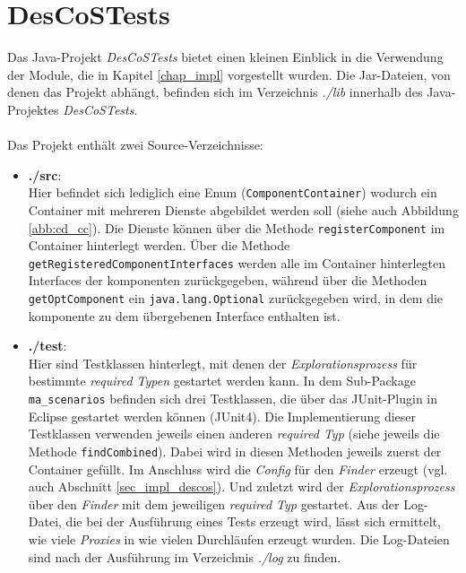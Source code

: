 \chapter{DesCoSTests}\label{app_test}
Das Java-Projekt \emph{DesCoSTests} bietet einen kleinen Einblick in die Verwendung der \Gls{Modul}e, die in Kapitel \ref{chap_impl} vorgestellt wurden. Die Jar-Dateien, von denen das Projekt abhängt, befinden sich im Verzeichnis \emph{./lib} innerhalb des Java-Projektes \emph{DesCoSTests}.
\\\\
Das Projekt enthält zwei Source-Verzeichnisse:
\begin{itemize}
\item \textbf{./src}: \\
Hier befindet sich lediglich eine Enum (\texttt{ComponentContainer}) wodurch ein Container mit mehreren Dienste abgebildet werden soll (siehe auch Abbildung \ref{abb:cd_cc}). Die Dienste können über die Methode \texttt{registerComponent} im Container hinterlegt werden. Über die Methode \texttt{getRegisteredComponentInterfaces} werden alle im Container hinterlegten \Gls{Interface}s der \Gls{komponente}n zurückgegeben, während über die Methoden \texttt{getOptComponent} ein \texttt{java.lang.Optional} zurückgegeben wird, in dem die \Gls{komponente} zu dem übergebenen \Gls{Interface} enthalten ist.

\item \textbf{./test}:\\
Hier sind Testklassen hinterlegt, mit denen der \emph{Explorationsprozess} für bestimmte \emph{required Typen} gestartet werden kann. In dem Sub-Package \texttt{ma\_scenarios} befinden sich drei Testklassen, die über das JUnit-Plugin in Eclipse gestartet werden können (JUnit4). Die Implementierung dieser Testklassen verwenden jeweils einen anderen \emph{required Typ} (siehe jeweils die Methode \texttt{findCombined}). Dabei wird in diesen Methoden jeweils zuerst der Container gefüllt. Im Anschluss wird die \emph{Config} für den \emph{Finder} erzeugt (vgl. auch Abschnitt \ref{sec_impl_descos}). Und zuletzt wird der \emph{Explorationsprozess} über den \emph{Finder} mit dem jeweiligen \emph{required Typ} gestartet. Aus der Log-Datei, die bei der Ausführung eines Tests erzeugt wird, lässt sich ermittelt, wie viele \emph{Proxies} in wie vielen Durchläufen erzeugt wurden. Die Log-Dateien sind nach der Ausführung im Verzeichnis \emph{./log} zu finden.
\end{itemize}
